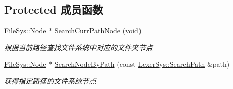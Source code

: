 \subsection*{Protected 成员函数}
\begin{DoxyCompactItemize}
\item 
\hyperlink{class_file_sys_1_1_node}{File\-Sys\-::\-Node} $\ast$ \hyperlink{class_command_sys_1_1_console_command_ad82b62c3e6220ad46c31d611f9e42e6b}{Search\-Curr\-Path\-Node} (void)
\begin{DoxyCompactList}\small\item\em 根据当前路径查找文件系统中对应的文件夹节点 \end{DoxyCompactList}\item 
\hyperlink{class_file_sys_1_1_node}{File\-Sys\-::\-Node} $\ast$ \hyperlink{class_command_sys_1_1_console_command_a2aab8c2ebe6250fb8fc7a41b1ad358c0}{Search\-Node\-By\-Path} (const \hyperlink{class_lexer_sys_1_1_search_path}{Lexer\-Sys\-::\-Search\-Path} \&path)
\begin{DoxyCompactList}\small\item\em 获得指定路径的文件系统节点 \end{DoxyCompactList}\end{DoxyCompactItemize}
